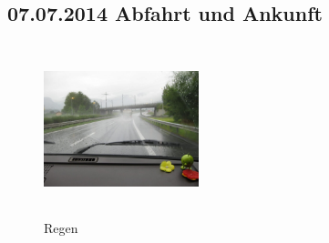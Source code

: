 % 

\subsection{07.07.2014 Abfahrt und Ankunft}

\begin{figure} 
  \begin{centering}
    \includegraphics[width=0.4\textwidth, height=5cm, keepaspectratio]{../Bilder/Dolomiten/1.jpg}
    \caption{Regen}
  \end{centering}
\end{figure} 

